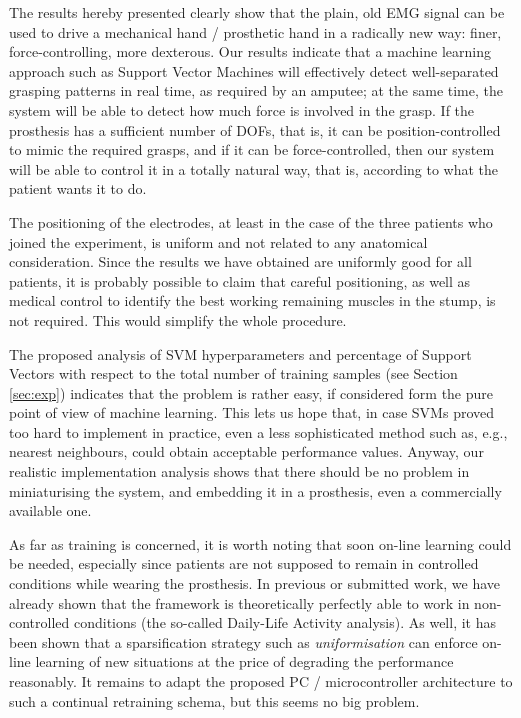 The results hereby presented clearly show that the plain, old EMG
signal can be used to drive a mechanical hand / prosthetic hand in a
radically new way: finer, force-controlling, more dexterous. Our
results indicate that a machine learning approach such as Support
Vector Machines will effectively detect well-separated grasping
patterns in real time, as required by an amputee; at the same time,
the system will be able to detect how much force is involved in the
grasp. If the prosthesis has a sufficient number of DOFs, that is, it
can be position-controlled to mimic the required grasps, and if it can
be force-controlled, then our system will be able to control it in a
totally natural way, that is, according to what the patient wants it
to do.

The positioning of the electrodes, at least in the case of the three
patients who joined the experiment, is uniform and not related to any
anatomical consideration. Since the results we have obtained are
uniformly good for all patients, it is probably possible to claim that
careful positioning, as well as medical control to identify the best
working remaining muscles in the stump, is not required. This would
simplify the whole procedure.

The proposed analysis of SVM hyperparameters and percentage of Support
Vectors with respect to the total number of training samples (see
Section \ref{sec:exp}) indicates that the problem is rather easy, if
considered form the pure point of view of machine learning. This lets
us hope that, in case SVMs proved too hard to implement in practice,
even a less sophisticated method such as, e.g., nearest neighbours,
could obtain acceptable performance values. Anyway, our realistic
implementation analysis shows that there should be no problem in
miniaturising the system, and embedding it in a prosthesis, even a
commercially available one.

As far as training is concerned, it is worth noting that soon on-line
learning could be needed, especially since patients are not supposed
to remain in controlled conditions while wearing the prosthesis. In
previous or submitted work, we have already shown that the framework
is theoretically perfectly able to work in non-controlled conditions
(the so-called Daily-Life Activity analysis). As well, it has been
shown that a sparsification strategy such as \emph{uniformisation} can
enforce on-line learning of new situations at the price of degrading
the performance reasonably. It remains to adapt the proposed PC /
microcontroller architecture to such a continual retraining schema,
but this seems no big problem.

